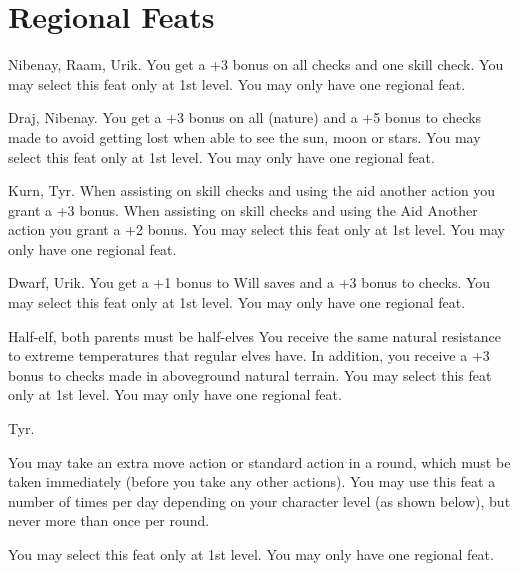 \section{Regional Feats}

{}
{Nibenay, Raam, Urik.}
{You get a +3 bonus on all  checks and one  skill check.}
{}
{You may select this feat only at 1st level. You may only have one regional feat.}

{}
{Draj, Nibenay.}
{You get a +3 bonus on all  (nature) and a +5 bonus to  checks made to avoid getting lost when able to see the sun, moon or stars.}
{}
{You may select this feat only at 1st level. You may only have one regional feat.}

{}
{Kurn, Tyr.}
{When assisting on skill checks and using the aid another action you grant a +3 bonus.}
{When assisting on skill checks and using the Aid Another action you grant a +2 bonus.}
{You may select this feat only at 1st level. You may only have one regional feat.}

{}
{Dwarf, Urik.}
{You get a +1 bonus to Will saves and a +3 bonus to  checks.}
{}
{You may select this feat only at 1st level. You may only have one regional feat.}

{}
{Half-elf, both parents must be half-elves}
{You receive the same natural resistance to extreme temperatures that regular elves have. In addition, you receive a +3 bonus to  checks made in aboveground natural terrain.}
{}
{You may select this feat only at 1st level. You may only have one regional feat.}

{}
{Tyr.}
{You may take an extra move action or standard action in a round, which must be taken immediately (before you take any other actions). You may use this feat a number of times per day depending on your character level (as shown below), but never more than once per round.

}
{}
{You may select this feat only at 1st level. You may only have one regional feat.}

